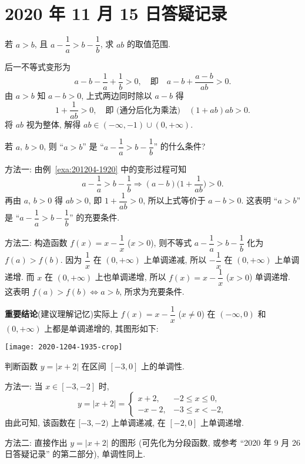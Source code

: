 \section{2020 年 11 月 15 日答疑记录}

\begin{example}\label{exa:201204-1920}
    若 $a>b$, 且 $a-\dfrac1a> b-\dfrac1b$, 求 $ab$ 的取值范围.
\end{example}
\begin{solution}
    后一不等式变形为
    \[a-b-\frac1a+\frac1b>0,\quad\text{即}\quad
      a-b+\frac{a-b}{ab}>0.\]
    由 $a>b$ 知 $a-b>0$, 上式两边同时除以 $a-b$ 得
    \[1+\frac1{ab}>0,\quad\text{即 (通分后化为乘法)}\quad (1+ab)ab>0.\]
    将 $ab$ 视为整体, 解得 $ab\in(-\infty,-1)\cup (0,+\infty)$.
\end{solution}

\begin{example}\label{exa:201206-1410}
    若 $a$, $b>0$, 则 ``$a>b$'' 是 ``$a-\dfrac1a> b-\dfrac1b$'' 的什么条件?
\end{example}
\begin{solution}
    方法一: 由例~\ref{exa:201204-1920} 中的变形过程可知
    \[a-\dfrac1a> b-\dfrac1b\Rightarrow
        (a-b)\biggl(1+\frac1{ab}\biggr)>0.\]
    再由 $a$, $b>0$ 得 $ab>0$, 即 $1+\dfrac1{ab}>0$, 所以上式等价于 $a-b>0$. 这表明 ``$a>b$'' 是 ``$a-\dfrac1a> b-\dfrac1b$'' 的充要条件.
    
    方法二: 构造函数 $f(x)=x-\dfrac1x$ ($x>0$), 则不等式 $a-\dfrac1a> b-\dfrac1b$ 化为 $f(a)>f(b)$. 因为 $\dfrac1x$ 在 $(0,+\infty)$ 上单调递减, 所以 $-\dfrac1x$ 在 $(0,+\infty)$ 上单调递增. 而 $x$ 在 $(0,+\infty)$ 上也单调递增, 所以 $f(x)=x-\dfrac1x$ ($x>0$) 单调递增. 这表明 $f(a)>f(b)\Leftrightarrow a>b$, 所求为充要条件.
\end{solution}

{\bfseries 重要结论}(建议理解记忆)\quad 实际上 $f(x)=x-\dfrac1x$ ($x\neq0$) 在 $(-\infty,0)$ 和 $(0,+\infty)$ 上都是单调递增的, 其图形如下:

    \begin{center}
        \texttt{[image: 2020-1204-1935-crop]}
    \end{center}
    
\begin{example}
    判断函数 $y=|x+2|$ 在区间 $[-3,0]$ 上的单调性.
\end{example}
\begin{solution}
    方法一: 当 $x\in[-3,-2]$ 时, 
    \[y=|x+2|=\begin{cases}
        x+2, & -2\leqslant x\leqslant 0,\\
        -x-2, & -3\leqslant x<-2,
    \end{cases}\]
    由此可知, 该函数在 $[-3,-2)$ 上单调递减, 在 $[-2,0]$ 上单调递增.
    
    方法二: 直接作出 $y=|x+2|$ 的图形 (可先化为分段函数, 或参考 ``2020 年 9 月 26 日答疑记录'' 的第二部分), 单调性同上.
\end{solution}

